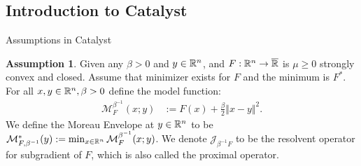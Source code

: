 \documentclass[11pt]{beamer}
\theoremstyle{definition}
\newtheorem{assumption}{Assumption}[section]
\begin{document}
    \subsection{Introduction to Catalyst}
        \begin{frame}{Assumptions in Catalyst}
            \begin{assumption}\label{ass:catalyst1}
                Given any $\beta > 0$ and $y \in \mathbb R^n$, and $F: \mathbb R^n\rightarrow \overline {\mathbb R}$ is $\mu \ge 0$ strongly convex and closed. 
                Assume that minimizer exists for $F$ and the minimum is $F^*$. 
                For all $x,y\in \mathbb R^n, \beta > 0$ define the model function: 
                \begin{align*}
                    \mathcal M^{\beta^{-1}}_F(x; y) &:= 
                    F(x) + \frac{\beta}{2}\Vert x - y\Vert^2.
                \end{align*}
                We define the Moreau Envelope at $y \in \mathbb R^n$ to be $\mathcal M^*_{F,\beta^{-1}}(y) := \min_{x\in \mathbb R^n} \mathcal M_F^{\beta^{-1}}(x; y)$. 
                We denote $\mathcal J_{\beta^{-1}F}$ to be the resolvent operator for subgradient of $F$, which is also called the proximal operator. 
            \end{assumption}
        \end{frame}
\end{document}
